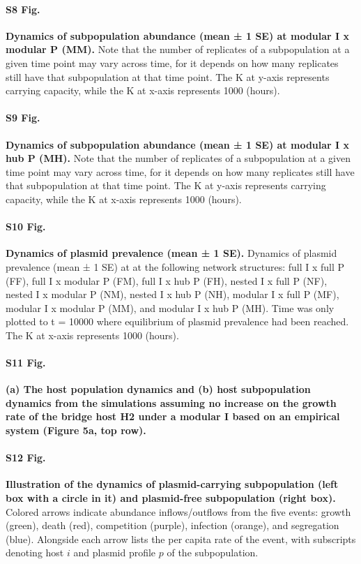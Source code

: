 \documentclass[10pt,letterpaper]{article}
\begin{document}
\paragraph*{S8 Fig.}
\label{S8_Fig}
{\bf Dynamics of subpopulation abundance (mean ± 1 SE) at modular I x modular P (MM).} Note that the number of replicates of a subpopulation at a given time point may vary across time, for it depends on how many replicates still have that subpopulation at that time point. The K at y-axis represents carrying capacity, while the K at x-axis represents 1000 (hours).

\paragraph*{S9 Fig.}
\label{S9_Fig}
{\bf Dynamics of subpopulation abundance (mean ± 1 SE) at modular I x hub P (MH).} Note that the number of replicates of a subpopulation at a given time point may vary across time, for it depends on how many replicates still have that subpopulation at that time point. The K at y-axis represents carrying capacity, while the K at x-axis represents 1000 (hours).

\paragraph*{S10 Fig.}
\label{S10_Fig}
{\bf Dynamics of plasmid prevalence (mean ± 1 SE).} Dynamics of plasmid prevalence (mean ± 1 SE) at at the following network structures: full I x full P (FF), full I x modular P (FM), full I x hub P (FH), nested I x full P (NF), nested I x modular P (NM), nested I x hub P (NH), modular I x full P (MF), modular I x modular P (MM), and modular I x hub P (MH). Time was only plotted to t = 10000 where equilibrium of plasmid prevalence had been reached. The K at x-axis represents 1000 (hours).

\paragraph*{S11 Fig.}
\label{S11_Fig}
{\bf (a) The host population dynamics and (b) host subpopulation dynamics from the simulations assuming no increase on the growth rate of the bridge host H2 under a modular \textbf{I} based on an empirical system (Figure 5a, top row).} 

\paragraph*{S12 Fig.}
\label{S12_Fig}
{\bf Illustration of the dynamics of plasmid-carrying subpopulation (left box with a circle in it) and plasmid-free subpopulation (right box).} Colored arrows indicate abundance inflows/outflows from the five events: growth (green), death (red), competition (purple), infection (orange), and segregation (blue). Alongside each arrow lists the per capita rate of the event, with subscripts denoting host $i$ and plasmid profile $p$ of the subpopulation.
\end{document}
